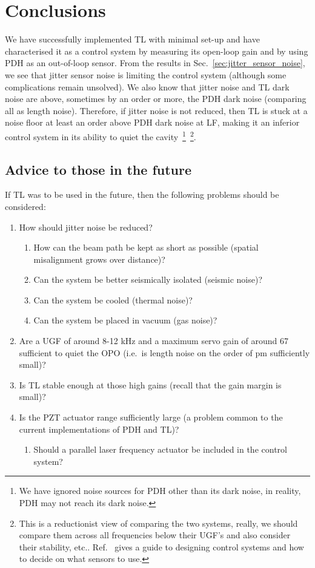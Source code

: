 \documentclass[aps,pra,superscriptaddress,reprint,nofootinbib]{revtex4-1}
\begin{document}
\section{Conclusions}
\label{sec:conclusions}

We have successfully implemented TL with minimal set-up and have characterised it as a control system by measuring its open-loop gain and by using PDH as an out-of-loop sensor. From the results in Sec.~\ref{sec:jitter_sensor_noise}, we see that jitter sensor noise is limiting the control system (although some complications remain unsolved). We also know that jitter noise and TL dark noise are above, sometimes by an order or more, the PDH dark noise (comparing all as length noise).
Therefore, if jitter noise is not reduced, then TL is stuck at a noise floor at least an order above PDH dark noise at LF, making it an inferior control system in its ability to quiet the cavity~\footnote{We have ignored noise sources for PDH other than its dark noise, in reality, PDH may not reach its dark noise.}~\footnote{This is a reductionist view of comparing the two systems, really, we should compare them across all frequencies below their UGF’s and also consider their stability, etc.. Ref.~\cite{FCS:2000} gives a guide to designing control systems and how to decide on what sensors to use.}.

\subsection{Advice to those in the future}

If TL was to be used in the future, then the following problems should be considered: 
\begin{enumerate}
\item How should jitter noise be reduced?
	\begin{enumerate}
	\item How can the beam path be kept as short as possible (spatial misalignment grows over distance)?
	\item Can the system be better seismically isolated (seismic noise)?
	\item Can the system be cooled (thermal noise)?
	\item Can the system be placed in vacuum (gas noise)?
	\end{enumerate}
\item Are a UGF of around 8-12 kHz and a maximum servo gain of around 67 sufficient to quiet the OPO (i.e.\ is length noise on the order of pm sufficiently small)?
\item Is TL stable enough at those high gains (recall that the gain margin is small)?
\item Is the PZT actuator range sufficiently large (a problem common to the current implementations of PDH and TL)?
	\begin{enumerate}
	\item Should a parallel laser frequency actuator be included in the control system?
	\end{enumerate}
\end{enumerate}


\nocite{*}


\end{document}
